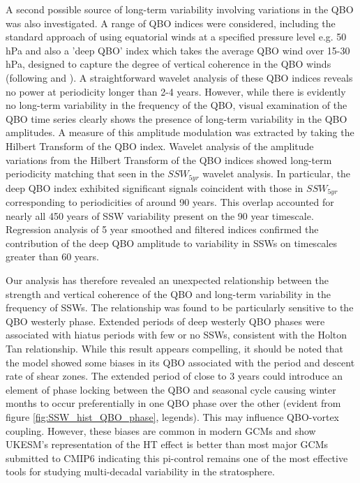 A second possible source of long-term variability involving variations in the QBO was also investigated. A range of QBO indices were considered, including the standard approach of using equatorial winds at a specified pressure level e.g. 50 hPa and also a 'deep QBO' index which takes the average QBO wind over 15-30 hPa, designed to capture the degree of vertical coherence in the QBO winds (following \cite{graySurface2018} and \cite{andrewsObserved2019}). A straightforward wavelet analysis of these QBO indices reveals no power at periodicity longer than 2-4 years. However, while there is evidently no long-term variability in the frequency of the QBO, visual examination of the QBO time series clearly shows the presence of  long-term variability in the QBO amplitudes. A measure of this amplitude modulation was extracted by taking the Hilbert Transform of the QBO index. Wavelet analysis of the amplitude variations from the Hilbert Transform of the QBO indices showed long-term periodicity matching that seen in the $SSW_{5yr}$ wavelet analysis. In particular, the deep QBO index exhibited significant signals coincident with those in $SSW_{5yr}$ corresponding to periodicities of around 90 years. This overlap accounted for nearly all 450 years of SSW variability present on the 90 year timescale. Regression analysis of 5 year smoothed and filtered indices confirmed the contribution of the deep QBO amplitude to variability in SSWs on timescales greater than 60 years. 

Our analysis has therefore revealed an unexpected relationship between the strength and vertical coherence of the QBO and long-term variability in the frequency of SSWs. The relationship was found to be particularly sensitive to the QBO westerly phase. Extended periods of deep westerly QBO phases were associated with hiatus periods with few or no SSWs, consistent with the Holton Tan relationship. While this result appears compelling, it should be noted that the model showed some biases in its QBO associated with the period and descent rate of shear zones. The extended period of close to 3 years could introduce an element of phase locking between the QBO and seasonal cycle causing winter months to occur preferentially in one QBO phase over the other (evident from figure \ref{fig:SSW_hist_QBO_phase}, legends). This may influence QBO-vortex coupling. However, these biases are common in modern GCMs \citep{bushellEvaluation2020} and \cite{raoModulation2019} show UKESM's representation of the HT effect is better than most major GCMs submitted to CMIP6 indicating this pi-control remains one of the most effective tools for studying multi-decadal variability in the stratosphere.

